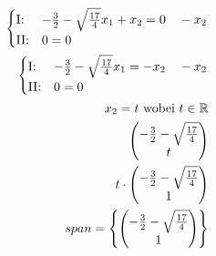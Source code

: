 \begin{align*}
    \begin{cases}
        \text{I:\@}  & -\frac{3}{2} - \sqrt{\frac{17}{4}}x_1 + x_2 = 0 \quad -x_2 \\
        \text{II:\@} & 0 = 0
    \end{cases} \\
    \begin{cases}
        \text{I:\@}  & -\frac{3}{2} - \sqrt{\frac{17}{4}}x_1 = -x_2 \quad -x_2 \\
        \text{II:\@} & 0 = 0
    \end{cases}    \\
    x_2 = t \text{ wobei } t \in \mathbb{R}                                              \\
    \begin{pmatrix}
        -\frac{3}{2} - \sqrt{\frac{17}{4}} \\ t
    \end{pmatrix}                                    \\
    t \cdot \begin{pmatrix}
                -\frac{3}{2} - \sqrt{\frac{17}{4}} \\ 1
            \end{pmatrix}                            \\
    span = \left\{\begin{pmatrix}
                      -\frac{3}{2} - \sqrt{\frac{17}{4}} \\ 1
                  \end{pmatrix}\right\}
\end{align*}

